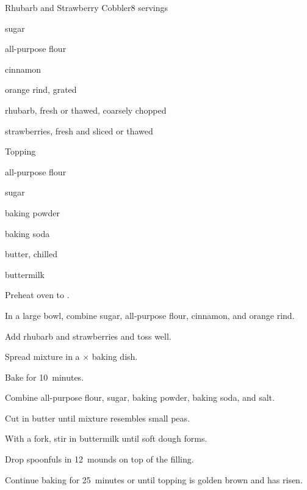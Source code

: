 \begin{recipe}{Rhubarb and Strawberry Cobbler}{}{8 servings}

\begin{ingredients}
\item \C{1\quarter} sugar
\item {} all-purpose flour
\item \tp{1\half} cinnamon
\item \tp{1\half} orange rind, grated
\item {} rhubarb, fresh or thawed, coarsely chopped
\item {} strawberries, fresh and sliced or thawed
\end{ingredients}
Topping
\begin{ingredients}
\item \C{1\half} all-purpose flour
\item {} sugar
\item \tp{1\half} baking powder
\item \tp{\half} baking soda
\item {} butter, chilled
\item {} buttermilk
\end{ingredients}

\begin{directions}
\item Preheat oven to .
\item In a large bowl, combine \C{1\quarter} sugar,  all-purpose flour, cinnamon, and orange rind.
\item Add rhubarb and strawberries and toss well.
\item Spread mixture in a $\times$ baking dish.
\item Bake for 10~minutes.
\item Combine \C{1\half} all-purpose flour,  sugar, baking powder, baking soda, and salt.
\item Cut in butter until mixture resembles small peas.
\item With a fork, stir in buttermilk until soft dough forms.
\item Drop spoonfuls in 12~mounds on top of the filling.
\item Continue baking for 25~minutes or until topping is golden brown and has risen.  
\end{directions}

\end{recipe}

